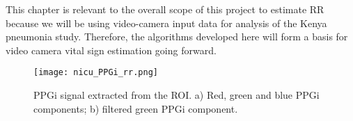 This chapter is relevant to the overall scope of this project to estimate RR because we will be using video-camera input data for analysis of the Kenya pneumonia study. Therefore, the algorithms developed here will form a basis for video camera vital sign estimation going forward.

\begin{center}
\begin{figure}[H]
\centering
\texttt{[image: nicu\_PPGi\_rr.png]}
      \caption[PPGi signal extracted from the ROI.] {PPGi signal extracted from the ROI. a) Red, green and blue PPGi components; b) filtered green PPGi component.} \label{ppgrr}
    \end{figure}
 \end{center}

\fi
